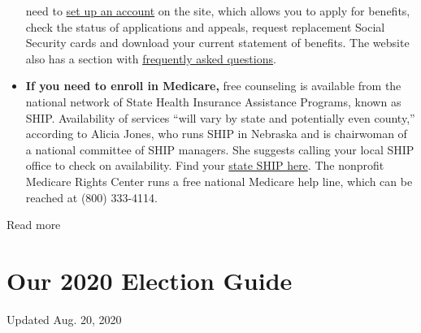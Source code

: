 \begin{itemize}
  need to \href{https://www.ssa.gov/onlineservices/}{set up an account}
  on the site, which allows you to apply for benefits, check the status
  of applications and appeals, request replacement Social Security cards
  and download your current statement of benefits. The website also has
  a section with \href{https://faq.ssa.gov/en-US/}{frequently asked
  questions}.
\item
  \textbf{If you need to enroll in Medicare,} free counseling is
  available from the national network of State Health Insurance
  Assistance Programs, known as SHIP. Availability of services ``will
  vary by state and potentially even county,'' according to Alicia
  Jones, who runs SHIP in Nebraska and is chairwoman of a national
  committee of SHIP managers. She suggests calling your local SHIP
  office to check on availability. Find your
  \href{https://www.shiptacenter.org/}{state SHIP here}. The nonprofit
  Medicare Rights Center runs a free national Medicare help line, which
  can be reached at (800) 333-4114.
\end{itemize}

Read more

\hypertarget{our-2020-election-guide}{%
\section{Our 2020 Election Guide}\label{our-2020-election-guide}}

Updated Aug. 20, 2020

